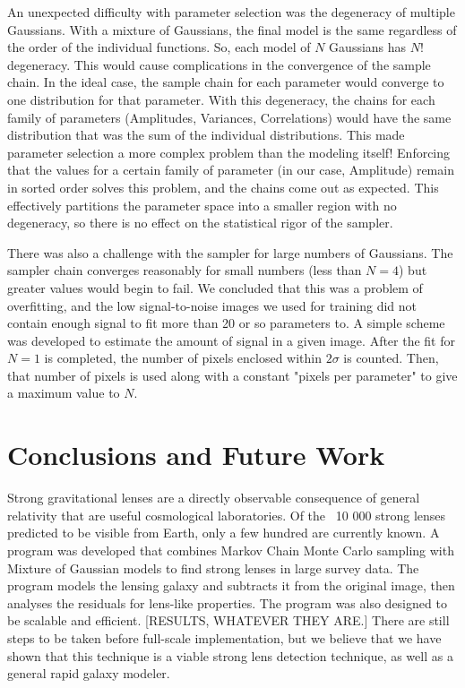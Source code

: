 \documentclass[authoryear, 12pt, 5p, times]{elsarticle}
\begin{document}
An unexpected difficulty with parameter selection was the degeneracy of multiple Gaussians. With a mixture of Gaussians, the final model is the same regardless of the order of the individual functions. So, each model of $N$ Gaussians has $N!$ degeneracy. This would cause complications in the convergence of the sample chain. In the ideal case, the sample chain for each parameter would converge to one distribution for that parameter. With this degeneracy, the chains for each family of parameters (Amplitudes, Variances, Correlations) would have the same distribution that was the sum of the individual distributions. This made parameter selection a more complex problem than the modeling itself! Enforcing that the values for a certain family of parameter (in our case, Amplitude) remain in sorted order solves this problem, and the chains come out as expected. This effectively partitions the parameter space into a smaller region with no degeneracy, so there is no effect on the statistical rigor of the sampler. 

There was also a challenge with the sampler for large numbers of Gaussians. The sampler chain converges reasonably for small numbers (less than $N = 4$) but greater values would begin to fail. We concluded that this was a problem of overfitting, and the low signal-to-noise images we used for training did not contain enough signal to fit more than 20 or so parameters to. A simple scheme was developed to estimate the amount of signal in a given image. After the fit for $N=1$ is completed, the number of pixels enclosed within $ 2 \sigma$ is counted. Then, that number of pixels is used along with a constant "pixels per parameter" to give a maximum value to $N$.

\section{Conclusions and Future Work}\label{conc}
Strong gravitational lenses are a directly observable consequence of general relativity that are useful cosmological laboratories. Of the ~10 000 strong lenses predicted to be visible from Earth, only a few hundred are currently known. A program was developed that combines Markov Chain Monte Carlo sampling with Mixture of Gaussian models to find strong lenses in large survey data. The program models the lensing galaxy and subtracts it from the original image, then analyses the residuals for lens-like properties. The program was also designed to be scalable and efficient. [RESULTS, WHATEVER THEY ARE.] There are still steps to be taken before full-scale implementation, but we believe that we have shown that this technique is a viable strong lens detection technique, as well as a general rapid galaxy modeler. 
\end{document}
